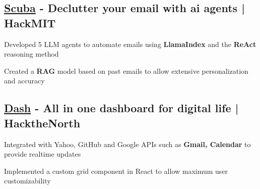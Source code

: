 

\subsection{\href{https://ballot.hackmit.org/project/mjetc-fjkza-ittbc-vrirn}{Scuba} - Declutter your email with ai agents | \textbf{HackMIT}}
\begin{zitemize}
    \item Developed 5 LLM agents to automate emails using \textbf{LlamaIndex} and the \textbf{ReAct} reasoning method
    \item Created a \textbf{RAG} model based on past emails to allow extensive personalization and accuracy
\end{zitemize}

\subsection{\href{https://devpost.com/software/dash-um2zil}{Dash} - All in one dashboard for digital life | \textbf{HacktheNorth}}
\begin{zitemize}
    \item Integrated with Yahoo, GitHub and Google APIs such as \textbf{Gmail, Calendar} to provide realtime updates
    \item Implemented a custom grid component in React to allow maximum user customizability
\end{zitemize}



